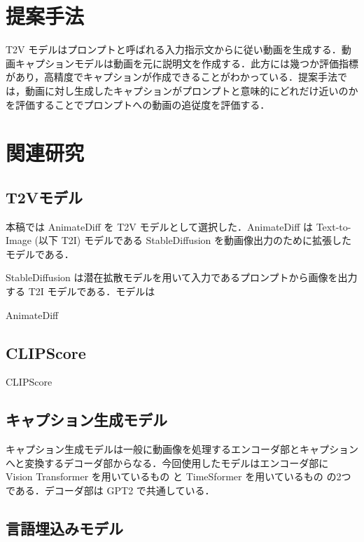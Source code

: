 \documentclass[10pt]{article}
\begin{document}
\section{提案手法}

T2V モデルはプロンプトと呼ばれる入力指示文からに従い動画を生成する．動画キャプションモデルは動画を元に説明文を作成する．此方には幾つか評価指標があり，高精度でキャプションが作成できることがわかっている．提案手法では，動画に対し生成したキャプションがプロンプトと意味的にどれだけ近いのかを評価することでプロンプトへの動画の追従度を評価する．

\section{関連研究}
\subsection{T2Vモデル}

本稿では AnimateDiff \cite{guo2023animatediff} を T2V モデルとして選択した．AnimateDiff は Text-to-Image (以下 T2I) モデルである StableDiffusion を動画像出力のために拡張したモデルである．

StableDiffusion \cite{rombach2022high} は潜在拡散モデルを用いて入力であるプロンプトから画像を出力する T2I モデルである．モデルは

AnimateDiff\cite{guo2023animatediff}

\subsection{CLIPScore}

CLIPScore\cite{hessel2021clipscore}

\subsection{キャプション生成モデル}

キャプション生成モデルは一般に動画像を処理するエンコーダ部とキャプションへと変換するデコーダ部からなる．今回使用したモデルはエンコーダ部に Vision Transformer \cite{dosovitskiy2020vit} を用いているもの \cite{vit+gpt2} と TimeSformer \cite{Bertasius2021tsf} を用いているもの \cite{tsf+gpt2} の2つである．デコーダ部は GPT2 \cite{radford2019gpt2} で共通している．

\subsection{言語埋込みモデル}
\end{document}
